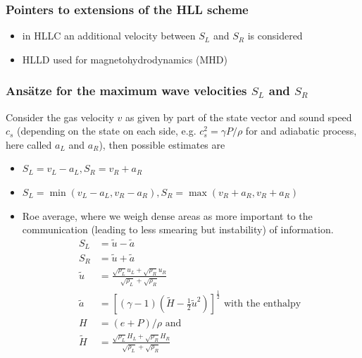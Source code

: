 \subsubsection{Pointers to extensions of the HLL scheme}
\begin{itemize}
    \item in HLLC an additional velocity between $S_L$ and $S_R$ is considered
    \item HLLD used for magnetohydrodynamics (MHD)
\end{itemize}

\subsubsection{Ansätze for the maximum wave velocities $S_L$ and $S_R$}
Consider the gas velocity $v$ as given by part of the state vector and
sound speed $c_s$ (depending on the state on each side, e.g. $c_s^2 = \gamma P \slash \rho$ for
and adiabatic process, here called $a_L$ and $a_R$), then
possible estimates are
\begin{itemize}
    \item $S_L = v_L - a_L, S_R = v_R + a_R$
    \item $S_L = \min(v_L - a_L, v_R - a_R), S_R = \max(v_R + a_R, v_R + a_R)$
    \item Roe average, where we weigh dense areas as more important to the communication (leading to less smearing but \textcolor{red1}{instability})
          of information.
          \begin{equation}
            \begin{aligned}
            S_L & =\tilde{u}-\tilde{a} \\
            S_R & =\tilde{u}+\tilde{a} \\
            \tilde{u} & =\frac{\sqrt{\rho_L} u_L+\sqrt{\rho_R} u_R}{\sqrt{\rho_L}+\sqrt{\rho_R}} \\
            \tilde{a} & =\left[(\gamma-1)\left(\widetilde{H}-\frac{1}{2} \tilde{u}^2\right)\right]^{\frac{1}{2}} \text { with the enthalpy } \\
            H & =(e+P) / \rho \text { and } \\
            \widetilde{H} & =\frac{\sqrt{\rho_L} H_L+\sqrt{\rho_R} H_R}{\sqrt{\rho_L}+\sqrt{\rho_R}}
            \end{aligned}
        \end{equation}
\end{itemize}

